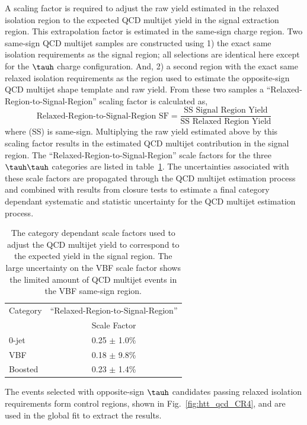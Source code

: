 A scaling factor is required to adjust the raw yield estimated in the relaxed isolation region to the expected
QCD multijet yield in the signal extraction region. This extrapolation factor
is estimated in the same-sign charge region. Two same-sign QCD multijet samples are constructed
using 1) the exact same isolation requirements as the signal region; all selections are identical
here except for the $\tauh$ charge configuration. And, 2) a second region with the exact 
same relaxed isolation requirements as the region used to estimate the opposite-sign
QCD multijet shape template and raw yield. From these two samples a ``Relaxed-Region-to-Signal-Region''
scaling factor is calculated as,
\begin{equation}
\label{eqn:htt_tt_qcd_sf}
\text{Relaxed-Region-to-Signal-Region SF} = \frac{\text{SS Signal Region Yield}}{\text{SS Relaxed Region Yield}}
\end{equation}
where (SS) is same-sign.
Multiplying the raw yield estimated above by this scaling factor results in the estimated
QCD multijet contribution in the signal region. The ``Relaxed-Region-to-Signal-Region'' scale factors
for the three $\tauh\tauh$ categories are listed in table~\ref{tab:htt_qcd_sf}. The uncertainties associated
with these scale factors are propagated through the QCD multijet estimation process and combined
with results from closure tests to estimate a final category dependant systematic and statistic uncertainty
for the QCD multijet estimation process.

\begin{table}[htbp]
\centering
\begin{tabular}{|l|c|}
\hline
Category   &   ``Relaxed-Region-to-Signal-Region''   \\
           &   Scale Factor   \\
\hline
0-jet      &    0.25 $\pm$ 1.0\%  \\
VBF        &    0.18 $\pm$ 9.8\%  \\
Boosted    &    0.23 $\pm$ 1.4\%  \\  
\hline
\end{tabular}
\label{tab:htt_qcd_sf}
\caption{
The category dependant scale factors used to adjust the QCD multijet yield to correspond 
to the expected yield in the signal region. The large uncertainty on the VBF scale factor shows the
limited amount of QCD multijet events in the VBF same-sign region. 
}
\end{table}

The events selected with opposite-sign $\tauh$ candidates passing relaxed isolation requirements 
form control regions, shown in Fig.~\ref{fig:htt_qcd_CR4}, and are used in the global fit to extract the results.

